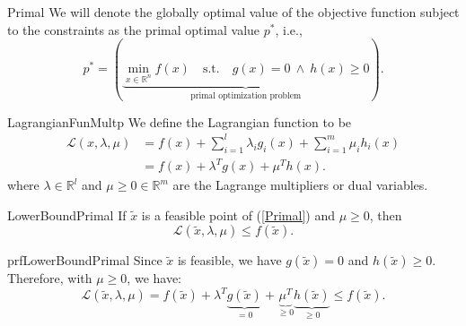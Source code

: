 \begin{theo}{Primal}
    We will denote the globally optimal value of the objective function subject to the constraints as the primal optimal value $p^*$, i\@.e\@., 
    \begin{equation*}
        p^* = \left( 
            \underbrace{\min_{x \in \mathbb{R}^n} f(x) \quad \text{s.t.} \quad g(x) = 0 \ \land \ h(x) \geq 0}_{\text{primal optimization problem}} 
            \right).
    \end{equation*}
\end{theo}


\begin{theo}{LagrangianFunMultp}
    We define the Lagrangian function to be 
    \begin{align*}
        \mathcal{L}(x, \lambda, \mu) 
            &= f(x) + \sum_{i=1}^l \lambda_i g_i(x) + \sum_{i=1}^m \mu_i h_i(x) \\
            &= f(x) + \lambda^T g(x) + \mu^T h(x).
    \end{align*}
    where $\lambda \in \mathbb{R}^l$ and $\mu \geq 0 \in \mathbb{R}^m$ are the Lagrange multipliers or dual variables.
\end{theo}

\newpage

\begin{lem}{LowerBoundPrimal}
    If $\tilde{x}$ is a feasible point of (\ref{Primal}) and $\mu \geq 0$, then
    \begin{equation*}
        \mathcal{L}(\tilde{x}, \lambda, \mu) \leq f(\tilde{x}).
    \end{equation*}
    \vspace*{-0.5cm}
\end{lem}

\begin{prf}{prfLowerBoundPrimal}
    Since $\tilde{x}$ is feasible, we have $g(\tilde{x}) = 0$ and $h(\tilde{x}) \geq 0$. Therefore, with $\mu \geq 0$, we have:
    \begin{equation*}
        \mathcal{L}(\tilde{x}, \lambda, \mu) = f(\tilde{x}) + \lambda^T \underbrace{g(\tilde{x})}_{=0} + \underbrace{\mu^T}_{\geq 0} \underbrace{h(\tilde{x})}_{\geq 0} \leq f(\tilde{x}).
    \end{equation*}
    \vspace*{-0.6cm}
\end{prf}


